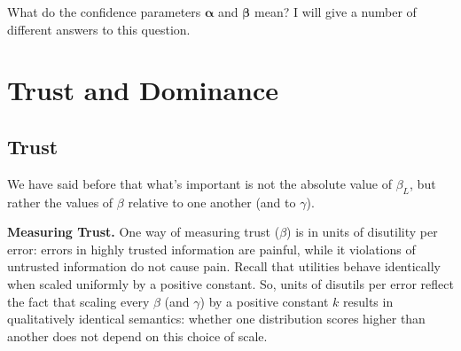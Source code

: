 \documentclass[twoside]{article} %
\theoremstyle{plain}
\theoremstyle{definition}
\newcommand{\balpha}{\boldsymbol\alpha}
\newcommand{\bbeta}{\boldsymbol\beta}
\begin{document}
    What do the confidence parameters $\balpha$ and $\bbeta$ mean? 
    I will give a number of different answers to this question.
    
    
    
\section{Trust and Dominance}\label{sec:trust-dominance}
    
    
    \subsection{Trust}
    
    We have said before that what's important is not the absolute value of $\beta_L$, but rather the values of $\beta$ relative to one another (and to $\gamma$).
    

    
    \textbf{Measuring Trust.}    
    One way of measuring trust ($\beta$) is in units of disutility per error: errors in highly trusted information are painful, while it violations of untrusted information do not cause pain. 
    Recall that utilities behave identically when scaled uniformly by a positive constant.
    So, units of disutils per error reflect the fact that scaling every $\beta$ (and $\gamma$) by a positive constant $k$ results in qualitatively identical semantics: whether one distribution scores higher than another does not depend on this choice of scale. 
    
\end{document}
